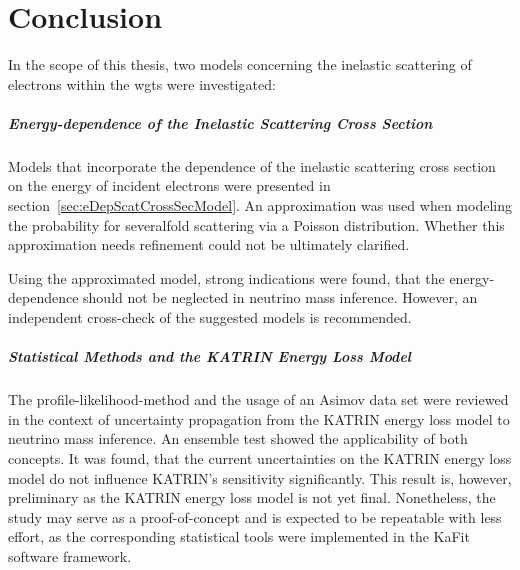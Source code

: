 \chapter{Conclusion}
\label{sec:conclusion}
In the scope of this thesis, two models concerning the inelastic scattering of electrons within the \gls{wgts} were investigated:

\paragraph{Energy-dependence of the Inelastic Scattering Cross Section}
Models that incorporate the dependence of the inelastic scattering cross section on the energy of incident electrons were presented in section~\ref{sec:eDepScatCrossSecModel}. An approximation was used when modeling the probability for severalfold scattering via a Poisson distribution. Whether this approximation needs refinement could not be ultimately clarified.

Using the approximated model, strong indications were found, that the energy-dependence should not be neglected in neutrino mass inference. However, an independent cross-check of the suggested models is recommended.

\paragraph{Statistical Methods and the KATRIN Energy Loss Model}
The profile-likelihood-method and the usage of an Asimov data set were reviewed in the context of uncertainty propagation from the KATRIN energy loss model to neutrino mass inference. An ensemble test showed the applicability of both concepts. It was found, that the current uncertainties on the KATRIN energy loss model do not influence KATRIN's sensitivity significantly. This result is, however, preliminary as the KATRIN energy loss model is not yet final. Nonetheless, the study may serve as a proof-of-concept and is expected to be repeatable with less effort, as the corresponding statistical tools were implemented in the KaFit software framework. 

